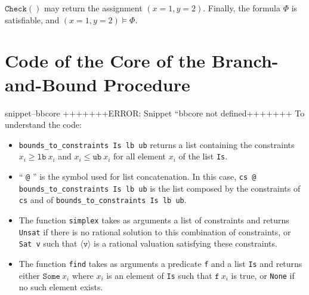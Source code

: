 \documentclass{article}
\newcommand{\icheck}{\mathtt{Check}()}
\newcommand{\Snippet}[1]{%
  \ifcsname snippet--#1\endcsname{\csname snippet--#1\endcsname}%
  \else+++++++ERROR: Snippet ``#1 not defined+++++++ \fi}
\begin{document}
$\icheck$ may return the assignment $(x=1, y=2)$. Finally, the formula $\Phi$
is satisfiable, and $(x=1, y=2) \vDash \Phi$.

\section{Code of the Core of the Branch-and-Bound Procedure}
\label{bbcode}

\Snippet{bbcore}
To understand the code:
\begin{itemize}
  \item \texttt{bounds\_to\_constraints Is lb ub} returns a list containing the
    constraints $x_i \geqslant \mathtt{lb}~x_i$ and
    $x_i \leqslant \mathtt{ub}~x_i$ for all element $x_i$ of the list
    \texttt{Is}.
  \item `` \texttt{@} '' is the symbol used for list concatenation. In this case,
    \linebreak \texttt{cs @ bounds\_to\_constraints Is lb ub} is the list
    composed by the constraints of \texttt{cs} and of
    \texttt{bounds\_to\_constraints~Is~lb~ub}.
  \item The function \texttt{simplex} takes as arguments a list of
    constraints and returns \texttt{Unsat} if there is no rational solution to
    this combination of constraints, or \texttt{Sat v} such that
    $\langle \mathtt{v} \rangle$ is a rational valuation satisfying these
    constraints.
  \item The function \texttt{find} takes as arguments a predicate \texttt{f}
    and a list \texttt{Is} and returns either $\mathtt{Some}~x_i$ where $x_i$ is
    an element of \texttt{Is} such that $\mathtt{f}~x_i$ is true, or
    \texttt{None} if no such element exists.
\end{itemize}
\end{document}
